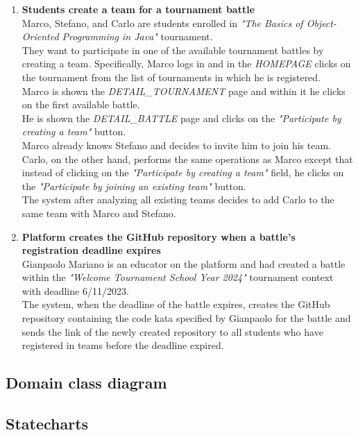 \begin{enumerate}
		\item \textbf{Students create a team for a tournament battle}\\
Marco, Stefano, and Carlo are students enrolled in \emph{"The Basics of Object-Oriented Programming in Java"} tournament.\\
They want to participate in one of the available tournament battles by creating a team.
Specifically, Marco logs in and in the \emph{HOMEPAGE} clicks on the tournament from the list of tournaments in which he is registered.\\
Marco is shown the \emph{DETAIL\_TOURNAMENT} page and within it he clicks on the first available battle.\\
He is shown the \emph{DETAIL\_BATTLE} page and clicks on the \emph{"Participate by creating a team"} button.\\
Marco already knows Stefano and decides to invite him to join his team.\\
Carlo, on the other hand, performs the same operations as Marco except that instead of clicking on the \emph{"Participate by creating a team"} field, he clicks on the \emph{"Participate by joining an existing team"} button.\\
The system after analyzing all existing teams decides to add Carlo to the same team with Marco and Stefano.
		
		\item \textbf{Platform creates the GitHub repository when a battle's registration deadline expires}\\
Gianpaolo Mariano is an educator on the platform and had created a battle within the \emph{"Welcome Tournament School Year 2024"} tournament context with deadline 6/11/2023.\\
The system, when the deadline of the battle expires, creates the GitHub repository containing the code kata specified by Gianpaolo for the battle and sends the link of the newly created repository to all students who have registered in teams before the deadline expired.

    	
\end{enumerate}


\subsection{Domain class diagram}

\subsection{Statecharts}




